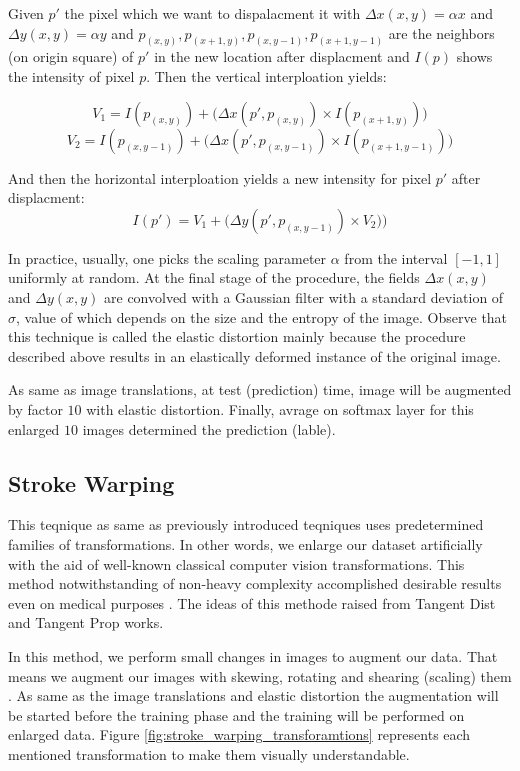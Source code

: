\begin{definition}{}
  Given $p'$ the pixel which we want to dispalacment it with $\Delta x(x,y)= \alpha x$ and $\Delta y(x,y)= \alpha y$ and $p_{(x,y)}, p_{(x+1,y)}, p_{(x,y-1)}, p_{(x+1,y-1)}$ are the neighbors (on
  origin square) of $p'$ in the new location after displacment and $I(p)$ shows the intensity of pixel $p$. Then the vertical interploation yields:

  $$V_1 = I(p_{(x,y)}) + \big( \Delta x(p', p_{(x,y)}) \times I(p_{(x+1,y)}) \big)$$
  $$V_2 = I(p_{(x,y-1)}) + \big( \Delta x(p', p_{(x,y-1)}) \times I(p_{(x+1,y-1)}) \big)$$

  And then the horizontal interploation yields a new intensity for pixel $p'$ after displacment:
  $$I(p') = V_1 + \big( \Delta y(p', p_{(x,y-1)}) \times V_2) \big)$$
\end{definition}

In practice, usually, one picks the scaling parameter $\alpha$ from the interval $[-1, 1]$ uniformly at random. At the final stage of the procedure, the fields  $\Delta x(x,  y)$ and $\Delta y(x,  y)$ are convolved with a Gaussian filter with a standard deviation of $\sigma$, value of which depends on the size and the entropy of the image. Observe that this technique is called the elastic distortion mainly because the procedure described above results in an elastically deformed instance of the original image.

As same as image translations, at test (prediction) time, image will be augmented by factor $10$
with elastic distortion. Finally, avrage on softmax layer for this enlarged $10$ images determined
the prediction (lable).

\subsection{Stroke Warping}
\label{tit:stroke-warping}
This teqnique as same as previously introduced teqniques uses predetermined families of transformations.
In other words, we enlarge our dataset artificially with the aid of well-known classical computer
vision transformations. This method notwithstanding of non-heavy complexity accomplished desirable
results even on medical purposes \cite{stroke_tumor}. The ideas of this methode raised from Tangent
Dist \cite{stroke_idea_1992} and Tangent Prop \cite{stroke_idea_1993} works.

In this method, we perform small changes in images to augment our data.  That means we augment our
images with skewing, rotating and shearing (scaling) them \cite{storke_warping_1997_source}. As same as the
image translations and elastic distortion the augmentation will be started before the
training phase and the training will be performed on enlarged data. Figure
\ref{fig:stroke_warping_transforamtions} represents each mentioned transformation to make them visually
understandable.

